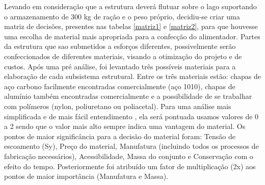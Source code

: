 Levando em consideração que a estrutura deverá  flutuar sobre o lago suportando o armazenamento de 300 kg de ração e o peso próprio, decidiu-se criar uma matriz de decisões, presentes nas tabelas \ref{matriz1} e \ref{matriz2}, para que houvesse uma escolha de material mais apropriada para a confecção do alimentador. Partes da estrutura que sao submetidos a esforços diferentes, possivelmente serão confeccionados de diferentes materiais, visando a otimização do projeto e de custos. Após uma pré análise, foi levantado três possíveis materiais para a elaboração de cada subsistema estrutural. Entre os três materiais estão: chapas de aço carbono facilmente encontradas comercialmente (aço 1010), chapas de alumínio também encontradas comercialmente e a possibilidade de se trabalhar com polímeros (nylon, poliuretano ou poliacetal). Para uma análise mais simplificada e de mais fácil entendimento , ela será pontuada usamos valores de 0 a 2 sendo que o valor mais alto sempre indica uma vantagem do material. Os pontos de maior significância para a decisão do material foram: Tensão de escoamento (Sy), Preço do material, Manufatura (incluindo todos os processos de fabricação necessários), Acessibilidade, Massa do conjunto e Conservação com o efeito do tempo. Posteriormente foi atribuído um fator de multiplicação (2x) aos pontos de maior importância (Manufatura e Massa).

